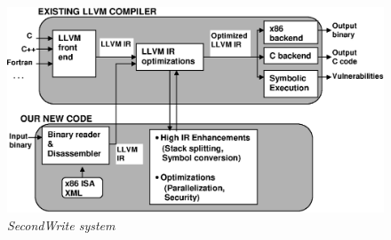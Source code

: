 \begin{figure}[t]
\centering
\includegraphics [width=0.7\linewidth] {figures/EPS/flow1.eps} 
\tiny{
\caption { \textit{SecondWrite system}}
}
\label{fig:Systemview}
\vspace{-2ex}
\end{figure}
